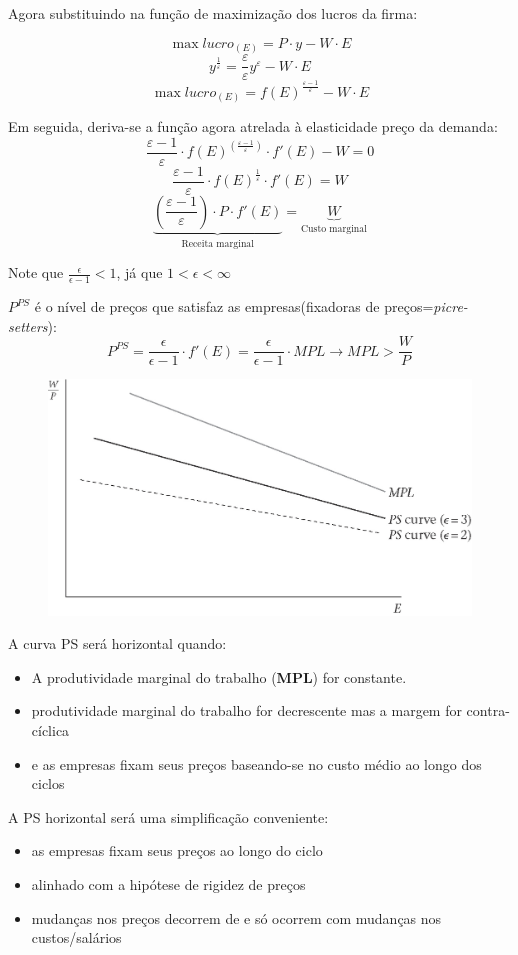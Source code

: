 \documentclass[a4paper,12pt]{article}[abntex2]
\begin{document}
Agora substituindo na função de maximização dos lucros da firma:

\[
\max lucro_{(E)} = P \cdot y - W \cdot E
\]
\[
y^{\frac{1}{\varepsilon}} = \frac{\varepsilon}{\varepsilon} y^{\varepsilon} - W \cdot E
\]
\[
\max lucro_{(E)} = f(E)^{\frac{\varepsilon -1}{\varepsilon}} - W \cdot E
\]

Em seguida, deriva-se a função agora atrelada à elasticidade preço da demanda:
\[
\frac{\varepsilon - 1}{\varepsilon} \cdot f(E)^{\left(\frac{\varepsilon - 1}{\varepsilon}\right)} \cdot f'(E) - W= 0
\]
\[
\frac{\varepsilon - 1}{\varepsilon} \cdot f(E)^{\frac{1}{\varepsilon}} \cdot f'(E) = W
\]
\[
\underbrace{\left(\frac{\varepsilon - 1}{\varepsilon} \right) \cdot P \cdot f'(E)}_\text{Receita marginal} = \underbrace{W}_\text{Custo marginal}
\]

Note que \(\frac{\epsilon}{\epsilon-1}<1\), já que \(1<\epsilon<\infty\)

\(P^{PS}\) é o nível de preços que satisfaz as empresas(fixadoras de preços=\textit{picre-setters}):
\[
P^{PS}=\frac{\epsilon}{\epsilon-1}\cdot f'(E)=\frac{\epsilon}{\epsilon-1}\cdot MPL \rightarrow MPL>\frac{W}{P}
\]
\begin{figure}[H]
    \centering
    \includegraphics[width=0.7\linewidth]{Imagens/a5i12.png}
\end{figure}

A curva PS será horizontal quando:\begin{itemize}
    \item A produtividade marginal do trabalho (\textbf{MPL}) for constante.
    \item produtividade marginal do trabalho for decrescente mas a margem for contra-cíclica
    \item e as empresas ﬁxam seus preços baseando-se no custo médio ao longo dos ciclos
\end{itemize}

A PS horizontal será uma simplificação conveniente:\begin{itemize}
    \item as empresas fixam seus preços ao longo do ciclo
    \item alinhado com a hipótese de rigidez de preços
    \item mudanças nos preços decorrem de e só ocorrem com mudanças nos custos/salários
\end{itemize}
\end{document}
